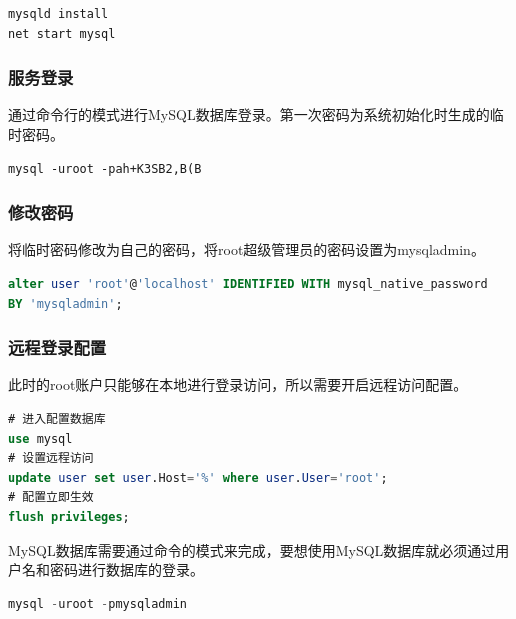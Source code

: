 \documentclass[12pt, openany, oneside]{book}
\begin{document}

\begin{lstlisting}
mysqld install
net start mysql
\end{lstlisting}

\subsubsection{服务登录}

通过命令行的模式进行MySQL数据库登录。第一次密码为系统初始化时生成的临时密码。 \\


\begin{lstlisting}
mysql -uroot -pah+K3SB2,B(B
\end{lstlisting}

\subsubsection{修改密码}

将临时密码修改为自己的密码，将root超级管理员的密码设置为mysqladmin。 \\


\begin{lstlisting}[language=SQL]
alter user 'root'@'localhost' IDENTIFIED WITH mysql_native_password
BY 'mysqladmin';
\end{lstlisting}

\subsubsection{远程登录配置}

此时的root账户只能够在本地进行登录访问，所以需要开启远程访问配置。 \\


\begin{lstlisting}[language=SQL]
# 进入配置数据库
use mysql
# 设置远程访问
update user set user.Host='%' where user.User='root';
# 配置立即生效
flush privileges;
\end{lstlisting}

MySQL数据库需要通过命令的模式来完成，要想使用MySQL数据库就必须通过用户名和密码进行数据库的登录。 \\


\begin{lstlisting}[language=SQL]
mysql -uroot -pmysqladmin
\end{lstlisting}
\end{document}
